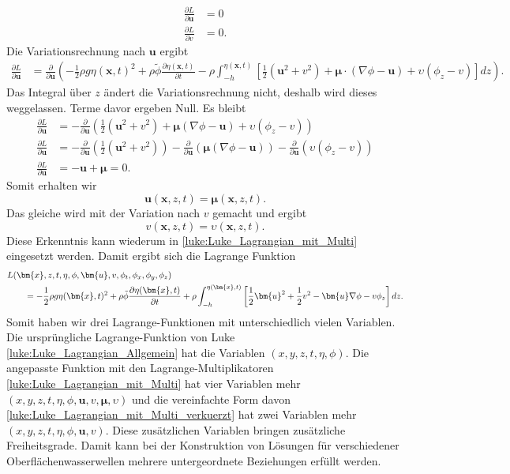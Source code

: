 \begin{align*}
\frac{\partial L}{\partial \bm{u}} &= 0
\\
\frac{\partial L}{\partial v} &= 0.
\end{align*}
Die Variationsrechnung nach $\bm{u}$ ergibt
\begin{align*}
	\frac{\partial L}{\partial \bm{u}}
	&=\frac{\partial \mathscr{}}{\partial \bm{u}}\left( -\frac{1}{2} \rho g \eta(\bm{x},t)^2 + \rho\tilde{\phi} \frac{\partial\eta(\bm{x},t)}{\partial t} -\rho \int_{-h}^{\eta(\bm{x},t)} \left[ \frac{1}{2} (\bm{u}^2 + v^2) + \bm{\mu} \cdot (\nabla\phi - \bm{u}) + \upsilon \left(\phi_z - v\right) \right] dz\right).
	\nonumber
\end{align*}
Das Integral über $z$ ändert die Variationsrechnung nicht, deshalb wird dieses weggelassen. Terme davor ergeben Null.
Es bleibt
\begin{align*}
	\frac{\partial L}{\partial \bm{u}} &= -\frac{\partial}{\partial \bm{u}} \left(\frac{1}{2} (\bm{u}^2 + v^2) + \bm{\mu} (\nabla\phi - \bm{u}) + \upsilon \left(\phi_z - v\right) \right)
	\\
	\frac{\partial L}{\partial \bm{u}} &= -\frac{\partial}{\partial \bm{u}} \left( \frac{1}{2} (\bm{u}^2 + v^2) \right)  -\frac{\partial}{\partial \bm{u}} \left( \bm{\mu} (\nabla\phi - \bm{u}) \right)  -\frac{\partial}{\partial \bm{u}} \left( \upsilon \left(\phi_z - v\right) \right)
	\\
	\frac{\partial L}{\partial \bm{u}} &=
	-\bm{u}
	+\bm{\mu} = 0.
\end{align*}
Somit erhalten wir
\begin{equation}
	\bm{u}(\bm{x},z,t) = \bm{\mu}(\bm{x},z,t).
\end{equation}
Das gleiche wird mit der Variation nach $v$ gemacht und ergibt
\begin{equation}
	v(\bm{x},z,t) = \upsilon(\bm{x},z,t).
\end{equation}
Diese Erkenntnis kann wiederum in \eqref{luke:Luke_Lagrangian_mit_Multi} eingesetzt werden.
Damit ergibt sich die Lagrange Funktion
\begin{align}
&L(\bm{x},z,t,\eta,\phi,\bm{u}, v,\phi_t,\phi_x, \phi_y, \phi_z)
\notag
\\
&\qquad=
	-
	\frac{1}{2}\rho g \eta(\bm{x},t)^2
	+
	\rho\tilde{\phi} \frac{\partial\eta(\bm{x},t)}{\partial t}
	+
	\rho\int_{-h}^{\eta(\bm{x},t)} \left[ \frac{1}{2} \bm{u}^2 + \frac{1}{2} v^2 - \bm{u} \nabla \phi - v \phi_z \right] dz.
	\label{luke:Luke_Lagrangian_mit_Multi_verkuerzt}
\end{align}
Somit haben wir drei Lagrange-Funktionen mit unterschiedlich vielen Variablen.
Die ursprüngliche Lagrange-Funktion von Luke \eqref{luke:Luke_Lagrangian_Allgemein} hat die Variablen $(x,y,z,t,\eta,\phi)$.
Die angepasste Funktion mit den Lagrange-Multiplikatoren \eqref{luke:Luke_Lagrangian_mit_Multi} hat vier Variablen mehr $(x,y,z,t,\eta,\phi,\bm{u},v,\bm{\mu},\upsilon)$ und die vereinfachte Form davon \eqref{luke:Luke_Lagrangian_mit_Multi_verkuerzt} hat zwei Variablen mehr $(x,y,z,t,\eta,\phi,\bm{u},v)$.
Diese zusätzlichen Variablen bringen zusätzliche Freiheitsgrade.
Damit kann bei der Konstruktion von Lösungen für verschiedener Oberflächenwasserwellen mehrere untergeordnete Beziehungen erfüllt werden.

